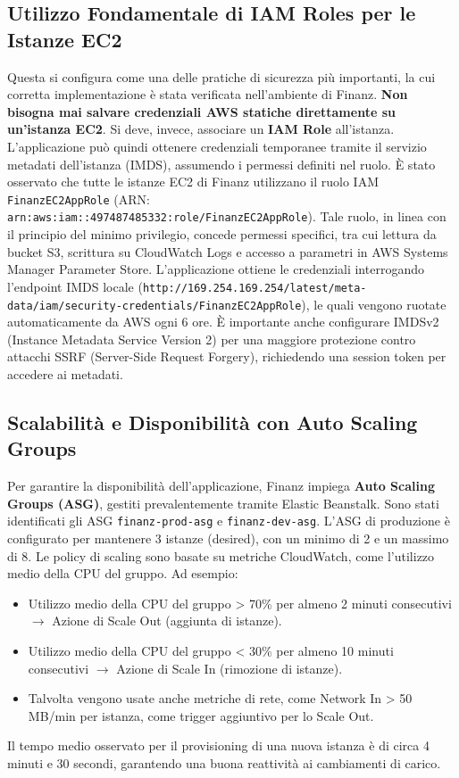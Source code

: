 \subsection{Utilizzo Fondamentale di IAM Roles per le Istanze EC2}
\label{subsec:iam-roles-ec2_cap2}
Questa si configura come una delle pratiche di sicurezza più importanti, la cui corretta implementazione è stata verificata nell'ambiente di Finanz.
\textbf{Non bisogna mai salvare credenziali AWS statiche direttamente su un'istanza EC2}.
Si deve, invece, associare un \textbf{IAM Role} all'istanza.
L'applicazione può quindi ottenere credenziali temporanee tramite il servizio metadati dell'istanza (IMDS), assumendo i permessi definiti nel ruolo.
È stato osservato che tutte le istanze EC2 di Finanz utilizzano il ruolo IAM \texttt{FinanzEC2AppRole} (ARN: \texttt{arn:aws:iam::497487485332:role/\allowbreak{}FinanzEC2AppRole}).
Tale ruolo, in linea con il principio del minimo privilegio, concede permessi specifici, tra cui lettura da bucket S3, scrittura su CloudWatch Logs e accesso a parametri in AWS Systems Manager Parameter Store.
L'applicazione ottiene le credenziali interrogando l'endpoint IMDS locale (\texttt{http://169.254.169.254/latest/meta-data/\allowbreak{}iam/security-credentials/\allowbreak{}FinanzEC2AppRole}), le quali vengono ruotate automaticamente da AWS ogni 6 ore. È importante anche configurare IMDSv2 (Instance Metadata Service Version 2) per una maggiore protezione contro attacchi SSRF (Server-Side Request Forgery), richiedendo una session token per accedere ai metadati.

\subsection{Scalabilità e Disponibilità con Auto Scaling Groups}
\label{subsec:auto-scaling_cap2}
Per garantire la disponibilità dell'applicazione, Finanz impiega \textbf{Auto Scaling Groups (ASG)}, gestiti prevalentemente tramite Elastic Beanstalk. Sono stati identificati gli ASG \texttt{finanz-prod-asg} e \texttt{finanz-dev-asg}.
L'ASG di produzione è configurato per mantenere 3 istanze (desired), con un minimo di 2 e un massimo di 8. Le policy di scaling sono basate su metriche CloudWatch, come l'utilizzo medio della CPU del gruppo. Ad esempio:
\begin{itemize}
    \item Utilizzo medio della CPU del gruppo > 70\% per almeno 2 minuti consecutivi $\rightarrow$ Azione di Scale Out (aggiunta di istanze).
    \item Utilizzo medio della CPU del gruppo < 30\% per almeno 10 minuti consecutivi $\rightarrow$ Azione di Scale In (rimozione di istanze).
    \item Talvolta vengono usate anche metriche di rete, come Network In > 50 MB/min per istanza, come trigger aggiuntivo per lo Scale Out.
\end{itemize}
Il tempo medio osservato per il provisioning di una nuova istanza è di circa 4 minuti e 30 secondi, garantendo una buona reattività ai cambiamenti di carico.

